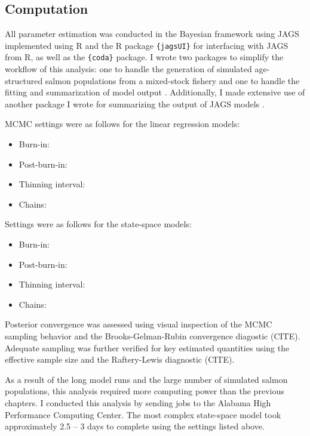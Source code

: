 \documentclass[12pt,]{book}
\providecommand{\tightlist}{%
  \setlength{\itemsep}{0pt}\setlength{\parskip}{0pt}}
\theoremstyle{definition}
\theoremstyle{definition}
\theoremstyle{definition}
\theoremstyle{remark}
\begin{document}
\subsection{Computation}\label{computation}

All parameter estimation was conducted in the Bayesian framework using
JAGS \citep{plummer-2017} implemented using R \citep{r-cite} and the R
package \texttt{\{jagsUI\}} \citep{r-jagsUI} for interfacing with JAGS
from R, as well as the \texttt{\{coda\}} \citep{r-coda} package. I wrote
two packages to simplify the workflow of this analysis: one to handle
the generation of simulated age-structured salmon populations from a
mixed-stock fishery \citep[\texttt{\{SimSR\}};][]{r-SimSR} and one to
handle the fitting and summarization of model output
\citep[\texttt{\{FitSR\}};][]{r-SimSR}. Additionally, I made extensive
use of another package I wrote for summarizing the output of JAGS models
\citep[\texttt{\{codaTools\}};][]{r-codaTools}.

\noindent
MCMC settings were as follows for the linear regression models:

\begin{itemize}
\tightlist
\item
  Burn-in:
\item
  Post-burn-in:
\item
  Thinning interval:
\item
  Chains:
\end{itemize}

\noindent
Settings were as follows for the state-space models:

\begin{itemize}
\tightlist
\item
  Burn-in:
\item
  Post-burn-in:
\item
  Thinning interval:
\item
  Chains:
\end{itemize}

Posterior convergence was assessed using visual inspection of the MCMC
sampling behavior and the Brooks-Gelman-Rubin convergence diagostic
(CITE). Adequate sampling was further verified for key estimated
quantities using the effective sample size and the Raftery-Lewis
diagnostic (CITE).

As a result of the long model runs and the large number of simulated
salmon populations, this analysis required more computing power than the
previous chapters. I conducted this analysis by sending jobs to the
Alabama High Performance Computing Center. The most complex state-space
model took approximately 2.5 -- 3 days to complete using the settings
listed above.
\end{document}
